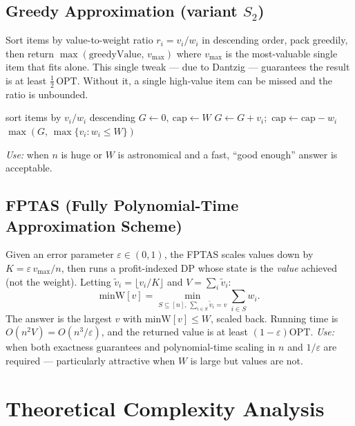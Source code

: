 \documentclass[11pt, a4paper]{article}
\begin{document}
\subsection{Greedy Approximation (variant $S_2$)}
Sort items by value-to-weight ratio $r_i=v_i/w_i$ in descending order, pack
greedily, then return $\max(\mathrm{greedyValue},\,v_{\max})$ where $v_{\max}$
is the most-valuable single item that fits alone. This single tweak --- due to
Dantzig --- guarantees the result is at least $\tfrac{1}{2}\,\mathrm{OPT}$.
Without it, a single high-value item can be missed and the ratio is unbounded.

\begin{algorithm}[H]
\caption{Greedy $S_2$ approximation}
\small
\begin{algorithmic}[1]
\State sort items by $v_i/w_i$ descending
\State $G\gets 0,\ \mathrm{cap}\gets W$
     $G\gets G+v_i$;\ $\mathrm{cap}\gets\mathrm{cap}-w_i$ \EndIf
\EndFor
\State \Return $\max(G,\,\max\{v_i:w_i\le W\})$
\end{algorithmic}
\end{algorithm}

\textit{Use:} when $n$ is huge or $W$ is astronomical and a fast, ``good enough''
answer is acceptable.

\subsection{FPTAS (Fully Polynomial-Time Approximation Scheme)}
Given an error parameter $\varepsilon\in(0,1)$, the FPTAS scales values down by
$K=\varepsilon\,v_{\max}/n$, then runs a profit-indexed DP whose state is the
\emph{value} achieved (not the weight). Letting
$\tilde v_i=\lfloor v_i/K\rfloor$ and $V=\sum_i \tilde v_i$:
\begin{equation}
\mathrm{minW}[v]=\min_{S\subseteq[n],\,\sum_{i\in S}\tilde v_i=v}\sum_{i\in S}w_i.
\end{equation}
The answer is the largest $v$ with $\mathrm{minW}[v]\le W$, scaled back. Running
time is $O(n^2 V)=O(n^3/\varepsilon)$, and the returned value is at least
$(1-\varepsilon)\mathrm{OPT}$. \textit{Use:} when both exactness guarantees and
polynomial-time scaling in $n$ and $1/\varepsilon$ are required --- particularly
attractive when $W$ is large but values are not.

\section{Theoretical Complexity Analysis}
\end{document}
